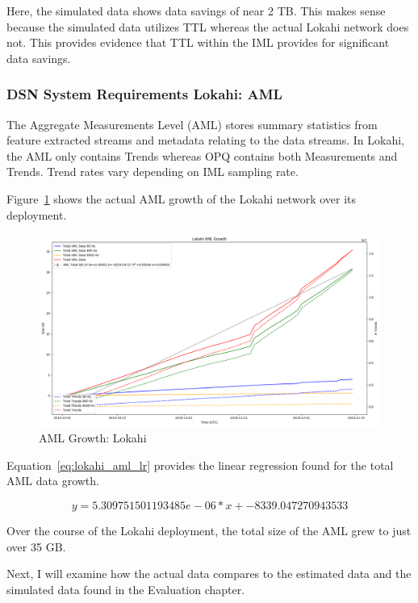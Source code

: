 Here, the simulated data shows data savings of near 2 TB. This makes sense because the simulated data utilizes TTL whereas the actual Lokahi network does not. This provides evidence that TTL within the IML provides for significant data savings.

\subsubsection{DSN System Requirements Lokahi: AML}

The Aggregate Measurements Level (AML) stores summary statistics from feature extracted streams and metadata relating to the data streams. In Lokahi, the AML only contains Trends whereas OPQ contains both Measurements and Trends. Trend rates vary depending on IML sampling rate.

Figure~\ref{fig:lokahi_actual_aml} shows the actual AML growth of the Lokahi network over its deployment.

\begin{figure}[H]
    \centering
    \includegraphics[width=\linewidth]{figures/lokahi_actual_aml.png}
    \caption{AML Growth: Lokahi}
    \label{fig:lokahi_actual_aml}
\end{figure}

Equation~\ref{eq:lokahi_aml_lr} provides the linear regression found for the total AML data growth.

\begin{equation}
    y = 5.309751501193485e-06 * x + -8339.047270943533
    \label{eq:lokahi_aml_lr}
\end{equation}

Over the course of the Lokahi deployment, the total size of the AML grew to just over 35 GB.

Next, I will examine how the actual data compares to the estimated data and the simulated data found in the Evaluation chapter.

